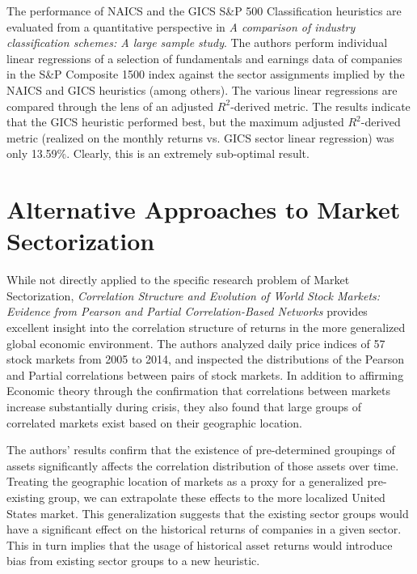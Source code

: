 \documentclass[../main.tex]{subfiles}
\begin{document}
The performance of NAICS and the GICS S\&P 500 Classification heuristics are evaluated from a quantitative perspective in \textit{A comparison of industry classification schemes: A large sample study}. The authors perform individual linear regressions of a selection of fundamentals and earnings data of companies in the S\&P Composite 1500 index against the sector assignments implied by the NAICS and GICS heuristics (among others). The various linear regressions are compared through the lens of an adjusted $R^2$-derived metric. The results indicate that the GICS heuristic performed best, but the maximum adjusted $R^2$-derived metric (realized on the monthly returns vs. GICS sector linear regression) was only 13.59\%. Clearly, this is an extremely sub-optimal result.


\section{Alternative Approaches to Market Sectorization}

While not directly applied to the specific research problem of Market Sectorization, \textit{Correlation Structure and Evolution of World Stock Markets: Evidence from Pearson and Partial Correlation-Based Networks} provides excellent insight into the correlation structure of returns in the more generalized global economic environment. The authors analyzed daily price indices of 57 stock markets from 2005 to 2014, and inspected the distributions of the Pearson and Partial correlations between pairs of stock markets. In addition to affirming Economic theory through the confirmation that correlations between markets increase substantially during crisis, they also found that large groups of correlated markets exist based on their geographic location.

The authors' results confirm that the existence of pre-determined groupings of assets significantly affects the correlation distribution of those assets over time. Treating the geographic location of markets as a proxy for a generalized pre-existing group, we can extrapolate these effects to the more localized United States market. This generalization suggests that the existing sector groups would have a significant effect on the historical returns of companies in a given sector. This in turn implies that the usage of historical asset returns would introduce bias from existing sector groups to a new heuristic.
\end{document}
